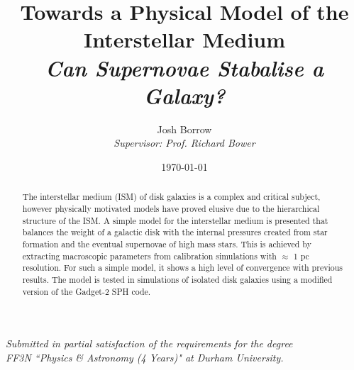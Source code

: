 
\begin{titlepage}

\thispagestyle{empty}

\author{Josh Borrow\\
\vspace{10mm}
\emph{Supervisor: Prof. Richard Bower}\\
\vspace{10mm}}
\date{\today}
\title{Towards a Physical Model of the Interstellar Medium\\
\vspace{4mm}
\large \emph{Can Supernovae Stabalise a Galaxy?}
\vspace{20mm}}
\maketitle

\vspace{20mm}

\begin{center}
\emph{{\small Submitted in partial satisfaction of the requirements for the degree}}\\
\emph{{\small FF3N ``Physics \& Astronomy (4 Years)" at Durham University.}}
\end{center}

\vspace{40mm}
\begin{abstract}
The interstellar medium (ISM) of disk galaxies is a complex and critical subject, however physically motivated models have proved elusive due to the hierarchical structure of the ISM. A simple model for the interstellar medium is presented that balances the weight of a galactic disk with the internal pressures created from star formation and the eventual supernovae of high mass stars. This is achieved by extracting macroscopic parameters from calibration simulations with $\approx$ 1 pc resolution. For such a simple model, it shows a high level of convergence with previous results. The model is tested in simulations of isolated disk galaxies using a modified version of the Gadget-2 SPH code.
\end{abstract}

\end{titlepage}

\newpage

